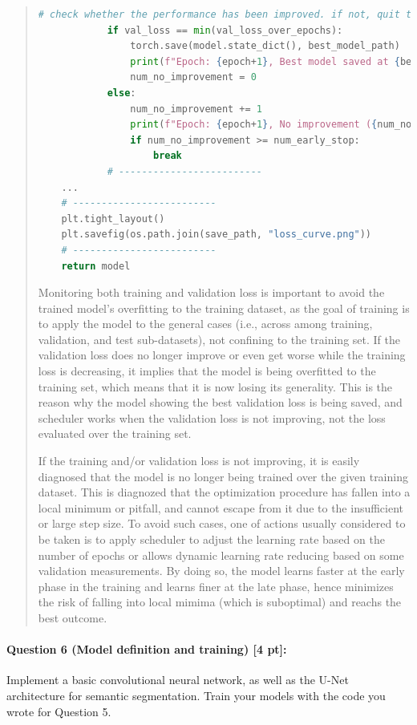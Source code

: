 \documentclass[11pt]{article}
\begin{document}
\begin{quote}
\begin{lstlisting}[language=Python, basicstyle=\scriptsize]
            # check whether the performance has been improved. if not, quit training
            if val_loss == min(val_loss_over_epochs):
                torch.save(model.state_dict(), best_model_path)
                print(f"Epoch: {epoch+1}, Best model saved at {best_model_path}")
                num_no_improvement = 0
            else:
                num_no_improvement += 1
                print(f"Epoch: {epoch+1}, No improvement ({num_no_improvement} / {num_early_stop})")
                if num_no_improvement >= num_early_stop:
                    break
            # -------------------------
    ...
    # -------------------------
    plt.tight_layout()
    plt.savefig(os.path.join(save_path, "loss_curve.png"))
    # -------------------------
    return model
\end{lstlisting}

Monitoring both training and validation loss is important to avoid the trained model's overfitting to the training dataset, as the goal of training is to apply the model to the general cases (i.e., across among training, validation, and test sub-datasets), not confining to the training set. If the validation loss does no longer improve or even get worse while the training loss is decreasing, it implies that the model is being overfitted to the training set, which means that it is now losing its generality. This is the reason why the model showing the best validation loss is being saved, and scheduler works when the validation loss is not improving, not the loss evaluated over the training set. 

If the training and/or validation loss is not improving, it is easily diagnosed that the model is no longer being trained over the given training dataset. This is diagnozed that the optimization procedure has fallen into a local minimum or pitfall, and cannot escape from it due to the insufficient or large step size. To avoid such cases, one of actions usually considered to be taken is to apply scheduler to adjust the learning rate based on the number of epochs or allows dynamic learning rate reducing based on some validation measurements. By doing so, the model learns faster at the early phase in the training and learns finer at the late phase, hence minimizes the risk of falling into local mimima (which is suboptimal) and reachs the best outcome.

\end{quote}

\paragraph{Question 6 (Model definition and training) [4 pt]:} 
Implement a basic convolutional neural network, as well as the U-Net architecture for semantic segmentation. Train your models with the code you wrote for Question 5.
\end{document}
